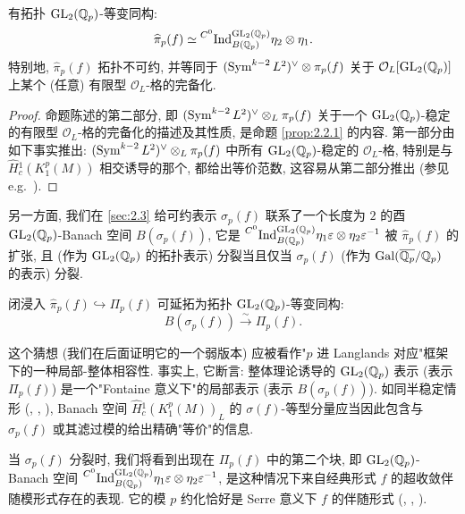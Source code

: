 \begin{proposition}\label{prop:3.3.1}
有拓扑 $\mathrm{GL}_2(\mathbb{Q}_p)$-等变同构:
\[
\widehat{\pi}_p(f) \simeq \prescript{C^{0}}{}{\mathrm{Ind}}_{B(\mathbb{Q}_p)}^{\mathrm{GL}_2(\mathbb{Q}_p)} \eta_2 \otimes \eta_1.
\]
特别地, $\widehat{\pi}_p(f)$ 拓扑不可约, 并等同于 $(\operatorname{Sym}^{k-2}L^{2})^{\vee} \otimes \pi_p(f)$ 关于 $\mathcal{O}_L[\mathrm{GL}_2(\mathbb{Q}_p)]$ 上某个 (任意) 有限型 $\mathcal{O}_L$-格的完备化.
\end{proposition}

\begin{proof}
命题陈述的第二部分, 即 $(\operatorname{Sym}^{k-2}L^{2})^{\vee} \otimes_L \pi_p(f)$ 关于一个 $\mathrm{GL}_2(\mathbb{Q}_p)$-稳定的有限型 $\mathcal{O}_L$-格的完备化的描述及其性质, 是命题 \ref{prop:2.2.1} 的内容.
第一部分由如下事实推出: $(\operatorname{Sym}^{k-2}L^{2})^{\vee} \otimes_L \pi_p(f)$ 中所有 $\mathrm{GL}_2(\mathbb{Q}_p)$-稳定的 $\mathcal{O}_L$-格, 特别是与 $\widehat{H}{}_{c}^{1}(K_1^{p}(M))$ 相交诱导的那个, 都给出等价范数, 这容易从第二部分推出 (参见 e.g.\ \cite[Cor.~5.4.4]{ref:3}).
\end{proof}

另一方面, 我们在 \ref{sec:2.3} 给可约表示 $\sigma_p(f)$ 联系了一个长度为 $2$ 的酉 $\mathrm{GL}_2(\mathbb{Q}_p)$-Banach 空间 $B(\sigma_p(f))$, 它是 $\prescript{C^{0}}{}{\mathrm{Ind}}_{B(\mathbb{Q}_p)}^{\mathrm{GL}_2(\mathbb{Q}_p)} \eta_1\varepsilon \otimes \eta_2\varepsilon^{-1}$ 被 $\widehat{\pi}_p(f)$ 的扩张, 且 (作为 $\mathrm{GL}_2(\mathbb{Q}_p)$ 的拓扑表示) 分裂当且仅当 $\sigma_p(f)$ (作为 $\operatorname{Gal}(\overline{\mathbb{Q}_p}/\mathbb{Q}_p)$ 的表示) 分裂.

\begin{conjecture}\label{conj:3.3.2}
闭浸入 $\widehat{\pi}_p(f) \hookrightarrow \Pi_p(f)$ 可延拓为拓扑 $\mathrm{GL}_2(\mathbb{Q}_p)$-等变同构:
\[
B(\sigma_p(f)) \xrightarrow{\sim} \Pi_p(f).
\]
\end{conjecture}

这个猜想 (我们在后面证明它的一个弱版本) 应被看作"$p$ 进 Langlands 对应"框架下的一种局部-整体相容性.
事实上, 它断言: 整体理论诱导的 $\mathrm{GL}_2(\mathbb{Q}_p)$ 表示 (表示 $\Pi_p(f)$) 是一个"Fontaine 意义下"的局部表示 (表示 $B(\sigma_p(f))$).
如同半稳定情形 (\cite{ref:8}, \cite{ref:9}, \cite{ref:18}), Banach 空间 $\widehat{H}{}_{c}^{1}(K_1^{p}(M))_L$ 的 $\sigma(f)$-等型分量应当因此包含与 $\sigma_p(f)$ 或其滤过模的给出精确"等价"的信息.

当 $\sigma_p(f)$ 分裂时, 我们将看到出现在 $\Pi_p(f)$ 中的第二个块, 即 $\mathrm{GL}_2(\mathbb{Q}_p)$-Banach 空间 $\prescript{C^{0}}{}{\mathrm{Ind}}_{B(\mathbb{Q}_p)}^{\mathrm{GL}_2(\mathbb{Q}_p)} \eta_1\varepsilon \otimes \eta_2\varepsilon^{-1}$, 是这种情况下来自经典形式 $f$ 的超收敛伴随模形式存在的表现.
它的模 $p$ 约化恰好是 Serre 意义下 $f$ 的伴随形式 (\cite{ref:33}, \cite{ref:37}, \cite{ref:29}).
